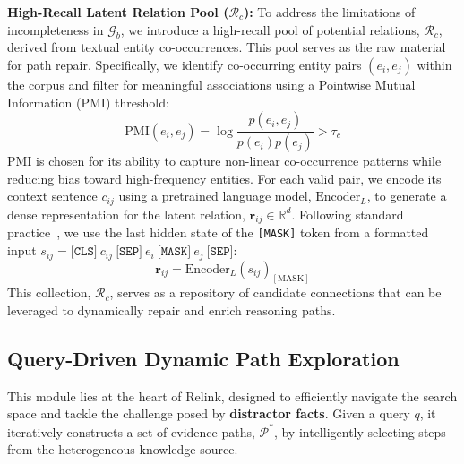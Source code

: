 \documentclass[letterpaper]{article} %
\begin{document}
\vspace{0.3em}
\noindent\textbf{High-Recall Latent Relation Pool ($\mathcal{R}_c$):} To address the limitations of incompleteness in $\mathcal{G}_b$, we introduce a high-recall pool of potential relations, $\mathcal{R}_c$, derived from textual entity co-occurrences. This pool serves as the raw material for path repair. Specifically, we identify co-occurring entity pairs $(e_i, e_j)$ within the corpus and filter for meaningful associations using a Pointwise Mutual Information (PMI) threshold:
\[
\text{PMI}(e_i, e_j) = \log \frac{p(e_i, e_j)}{p(e_i)p(e_j)} > \tau_c
\]
PMI is chosen for its ability to capture non-linear co-occurrence patterns while reducing bias toward high-frequency entities. For each valid pair, we encode its context sentence $c_{ij}$ using a pretrained language model, $\text{Encoder}_L$, to generate a dense representation for the latent relation, $\mathbf{r}_{ij} \in \mathbb{R}^d$. Following standard practice~\cite{matchPrompt,PromptORE}, we use the last hidden state of the \texttt{[MASK]} token from a formatted input $s_{ij} = \texttt{[CLS]}~c_{ij}~\texttt{[SEP]}~e_i~\texttt{[MASK]}~e_j~\texttt{[SEP]}$:
\[
\mathbf{r}_{ij} = \text{Encoder}_L(s_{ij})_{[\text{MASK}]}
\]
This collection, $\mathcal{R}_c$, serves as a repository of candidate connections that can be leveraged to dynamically repair and enrich reasoning paths.

\subsection{Query-Driven Dynamic Path Exploration}

This module lies at the heart of Relink, designed to efficiently navigate the search space and tackle the challenge posed by \textbf{distractor facts}. Given a query $q$, it iteratively constructs a set of evidence paths, $\mathcal{P}^*$, by intelligently selecting steps from the heterogeneous knowledge source.
\end{document}
